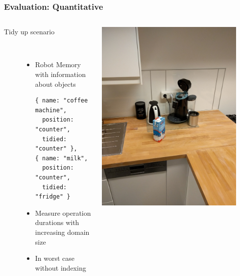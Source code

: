\begin{frame}[fragile]
  \frametitle{Evaluation: Quantitative}
  \begin{columns}
    \begin{column}{0.55\textwidth}
      \begin{description}
      \item[Tidy up scenario] \hfill \\
        \begin{itemize}
        \item Robot Memory with information about objects
          \begin{lstlisting}[style=SmallJSON,
            framexleftmargin=5pt, xleftmargin=0pt,
            morekeywords={}, numbers=none]
{ name: "coffee machine",
  position: "counter",
  tidied: "counter" },
{ name: "milk",
  position: "counter",
  tidied: "fridge" }
          \end{lstlisting}
        \item Measure operation durations with increasing domain size
        \item In worst case without indexing
        \end{itemize}
      \end{description}
    \end{column}
    \begin{column}{0.45\textwidth}
      \centering
    \includegraphics[width=0.9\textwidth]{../thesis/img/tidy-up}\\
    \end{column}
  \end{columns}
\end{frame}

